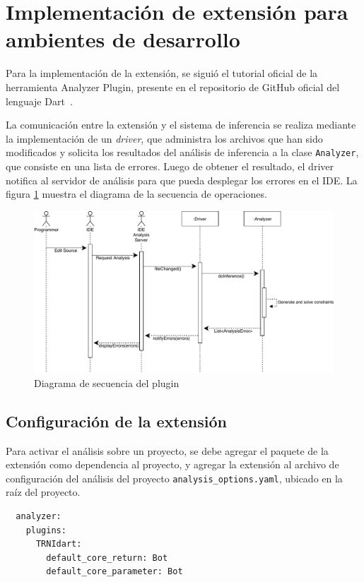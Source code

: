 \section{Implementación de extensión para ambientes de desarrollo}
Para la implementación de la extensión, se siguió el tutorial oficial de la herramienta Analyzer Plugin, presente en el repositorio de GitHub oficial del lenguaje Dart~\cite{plugin}.

La comunicación entre la extensión y el sistema de inferencia se realiza mediante la implementación de un \emph{driver}, que administra los archivos que han sido modificados y solicita los resultados del análisis de inferencia a la clase \texttt{Analyzer}, que consiste en una lista de errores. Luego de obtener el resultado, el driver notifica al servidor de análisis para que pueda desplegar los errores en el IDE. La figura \ref{seq} muestra el diagrama de la secuencia de operaciones.
\clearpage
\begin{figure}[ht]
  \centering
  \includegraphics[width=\textwidth]{imagenes/sequence.pdf}
  \caption{Diagrama de secuencia del plugin}
  \label{seq}
\end{figure}

\subsection{Configuración de la extensión}
Para activar el análisis sobre un proyecto, se debe agregar el paquete de la extensión como dependencia al proyecto, y agregar la extensión al archivo de configuración del análisis del proyecto \texttt{analysis\_options.yaml}, ubicado en la raíz del proyecto.

\begin{verbatim}
  analyzer:
    plugins:
      TRNIdart:
        default_core_return: Bot
        default_core_parameter: Bot
\end{verbatim}

